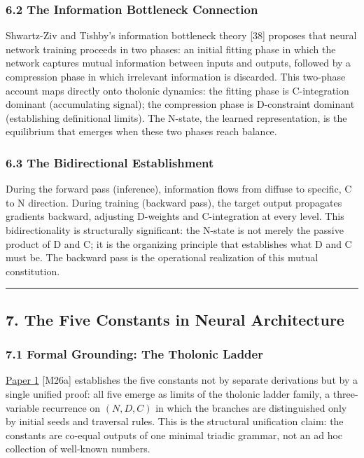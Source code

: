 \documentclass[
  11pt,
  letterpaper,
]{article}
\begin{document}
\subsubsection{6.2 The Information Bottleneck
Connection}\label{the-information-bottleneck-connection}

Shwartz-Ziv and Tishby's information bottleneck theory {[}38{]} proposes
that neural network training proceeds in two phases: an initial fitting
phase in which the network captures mutual information between inputs
and outputs, followed by a compression phase in which irrelevant
information is discarded. This two-phase account maps directly onto
tholonic dynamics: the fitting phase is C-integration dominant
(accumulating signal); the compression phase is D-constraint dominant
(establishing definitional limits). The N-state, the learned
representation, is the equilibrium that emerges when these two phases
reach balance.

\subsubsection{6.3 The Bidirectional
Establishment}\label{the-bidirectional-establishment}

During the forward pass (inference), information flows from diffuse to
specific, C to N direction. During training (backward pass), the target
output propagates gradients backward, adjusting D-weights and
C-integration at every level. This bidirectionality is structurally
significant: the N-state is not merely the passive product of D and C;
it is the organizing principle that establishes what D and C must be.
The backward pass is the operational realization of this mutual
constitution.

\begin{center}\rule{0.5\linewidth}{0.5pt}\end{center}

\subsection{7. The Five Constants in Neural
Architecture}\label{the-five-constants-in-neural-architecture}

\subsubsection{7.1 Formal Grounding: The Tholonic
Ladder}\label{formal-grounding-the-tholonic-ladder}

\href{https://github.com/baardev/truevalue/blob/main/docnav/Research/papers/1_recursive-tholonic-five-constants/1_recursive-tholonic-five-constants.pdf}{Paper
1} {[}M26a{]} establishes the five constants not by separate derivations
but by a single unified proof: all five emerge as limits of the tholonic
ladder family, a three-variable recurrence on \((N, D, C)\) in which the
branches are distinguished only by initial seeds and traversal rules.
This is the structural unification claim: the constants are co-equal
outputs of one minimal triadic grammar, not an ad hoc collection of
well-known numbers.
\end{document}
